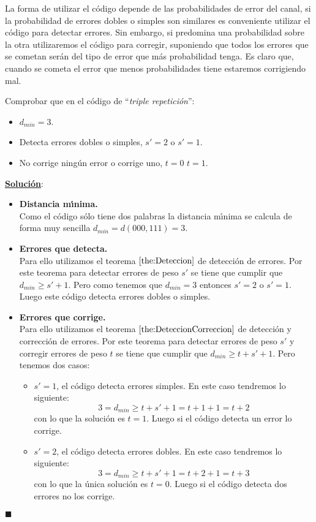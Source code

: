 La forma de utilizar el c\'odigo depende de las probabilidades de error del
canal, si la probabilidad de errores dobles o simples son similares es
conveniente utilizar el c\'odigo para detectar errores. Sin embargo,
si predomina
una probabilidad sobre la otra utilizaremos el c\'odigo para corregir, 
suponiendo que todos los errores que se cometan ser\'an del tipo de error que
m\'as probabilidad tenga. Es claro que, cuando se cometa el error que menos
probabilidades tiene estaremos corrigiendo mal.
%
%
\begin{ejercicio}\label{ejer:TripleRepeticion}
Comprobar que en el c\'odigo de ``\emph{triple repetici\'on}'':
\begin{itemize}
\item $d_{min}=3$.
\item Detecta errores dobles o simples, $s'=2$ o $s'=1$.
\item No corrige ning\'un error o corrige uno, $t=0$ $t=1$.
\end{itemize}
\end{ejercicio}
\underline{\textbf{Soluci\'on}}:
\begin{itemize}
\item \textbf{Distancia m\'{\i}nima.}\\
Como el c\'odigo s\'olo tiene dos palabras la distancia m\'{\i}nima se calcula
de forma muy sencilla $d_{min} = d(000,111) = 3$.
\item \textbf{Errores que detecta.}\\
Para ello utilizamos el teorema $\ref{the:Deteccion}$ de detecci\'on de errores.
Por este teorema para detectar errores de peso $s'$ se tiene que cumplir que
$d_{min}\geq s'+1$. Pero como tenemos que $d_{min}=3$ entonces $s'=2$ o $s'=1$.
Luego este c\'odigo detecta errores dobles o simples.
\item \textbf{Errores que corrige.}\\
Para ello utilizamos el teorema $\ref{the:DeteccionCorreccion}$ de detecci\'on
y correcci\'on de errores. Por este teorema para detectar errores de peso $s'$
y corregir errores de peso $t$ se tiene que cumplir que $d_{min}\geq t+s'+1$.
Pero tenemos dos casos:
\begin{itemize}
\item $s'=1$, el c\'odigo detecta errores simples. En este caso tendremos lo
siguiente:
\begin{displaymath}
3=d_{min}\geq t+s'+1=t+1+1=t+2
\end{displaymath}
con lo que la soluci\'on es $t=1$. Luego si el c\'odigo detecta un error lo
corrige.
\item $s'=2$, el c\'odigo detecta errores dobles. En este caso tendremos lo
siguiente:
\begin{displaymath}
3=d_{min}\geq t+s'+1=t+2+1=t+3
\end{displaymath}
con lo que la \'unica soluci\'on es $t=0$. Luego si el c\'odigo detecta dos
errores no los corrige.
\end{itemize}
\end{itemize}
\begin{flushright}
$\blacksquare$
\end{flushright}

